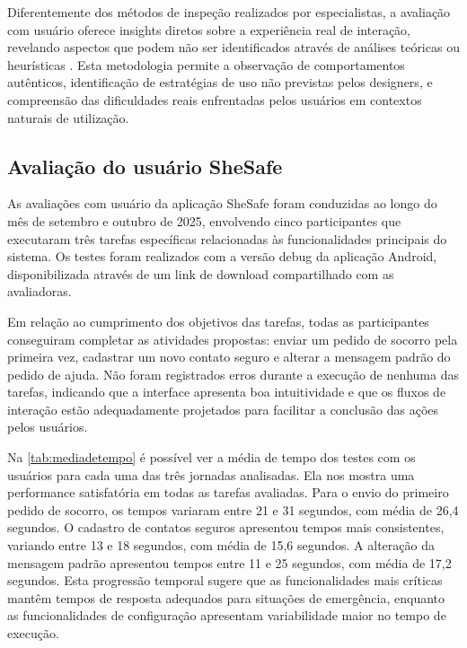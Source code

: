 Diferentemente dos métodos de inspeção realizados por especialistas, a avaliação com usuário oferece insights diretos sobre a experiência real de interação, revelando aspectos que podem não ser identificados através de análises teóricas ou heurísticas \cite{nielsen1994usability}. Esta metodologia permite a observação de comportamentos autênticos, identificação de estratégias de uso não previstas pelos designers, e compreensão das dificuldades reais enfrentadas pelos usuários em contextos naturais de utilização.
\subsection{Avaliação do usuário SheSafe}

As avaliações com usuário da aplicação SheSafe foram conduzidas ao longo do mês de setembro e outubro de 2025, envolvendo cinco participantes que executaram três tarefas específicas relacionadas às funcionalidades principais do sistema. Os testes foram realizados com a versão debug da aplicação Android, disponibilizada através de um link de download compartilhado com as avaliadoras.

Em relação ao cumprimento dos objetivos das tarefas, todas as participantes conseguiram completar as atividades propostas: enviar um pedido de socorro pela primeira vez, cadastrar um novo contato seguro e alterar a mensagem padrão do pedido de ajuda. Não foram registrados erros durante a execução de nenhuma das tarefas, indicando que a interface apresenta boa intuitividade e que os fluxos de interação estão adequadamente projetados para facilitar a conclusão das ações pelos usuários.

Na \autoref{tab:mediadetempo} é possível ver a média de tempo dos testes com os usuários para cada uma das três jornadas analisadas. Ela nos mostra uma performance satisfatória em todas as tarefas avaliadas. Para o envio do primeiro pedido de socorro, os tempos variaram entre 21 e 31 segundos, com média de 26,4 segundos. O cadastro de contatos seguros apresentou tempos mais consistentes, variando entre 13 e 18 segundos, com média de 15,6 segundos. A alteração da mensagem padrão apresentou tempos entre 11 e 25 segundos, com média de 17,2 segundos. Esta progressão temporal sugere que as funcionalidades mais críticas mantêm tempos de resposta adequados para situações de emergência, enquanto as funcionalidades de configuração apresentam variabilidade maior no tempo de execução.

